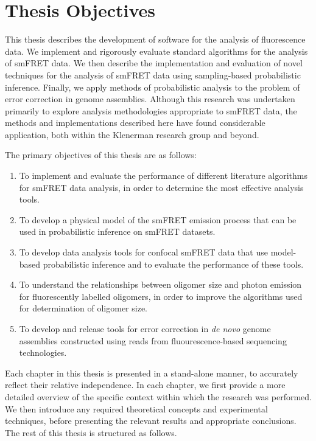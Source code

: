 \section{Thesis Objectives}
This thesis describes the development of software for the analysis of fluorescence data. We implement and rigorously evaluate standard algorithms for the analysis of smFRET data. We then describe the implementation and evaluation of novel techniques for the analysis of smFRET data using sampling-based probabilistic inference. Finally, we apply methods of probabilistic analysis to the problem of error correction in genome assemblies. Although this research was undertaken primarily to explore analysis methodologies appropriate to smFRET data, the methods and implementations described here have found considerable application, both within the Klenerman research group and beyond.

The primary objectives of this thesis are as follows:

\begin{enumerate}

\item To implement and evaluate the performance of different literature algorithms for smFRET data analysis, in order to determine the most effective analysis tools.

\item To develop a physical model of the smFRET emission process that can be used in probabilistic inference on smFRET datasets.

\item To develop data analysis tools for confocal smFRET data that use model-based probabilistic inference and to evaluate the performance of these tools.

\item To understand the relationships between oligomer size and photon emission for fluorescently labelled oligomers, in order to improve the algorithms used for determination of oligomer size.

\item To develop and release tools for error correction in \emph{de novo} genome assemblies constructed using reads from fluourescence-based sequencing technologies.    

\end{enumerate}

Each chapter in this thesis is presented in a stand-alone manner, to accurately reflect their relative independence. In each chapter, we first provide a more detailed overview of the specific context within which the research was performed. We then introduce any required theoretical concepts and experimental techniques, before presenting the relevant results and appropriate conclusions. The rest of this thesis is structured as follows.

